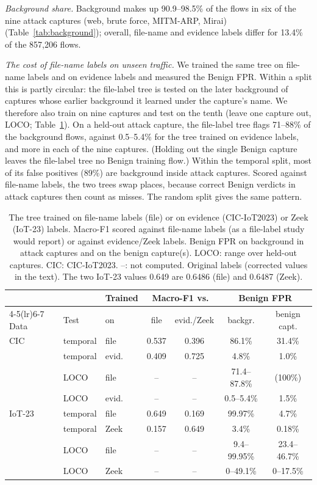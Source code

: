 \emph{Background share.} Background makes up 90.9--98.5\% of the flows in six of the nine attack captures (web, brute force, MITM-ARP, Mirai) (Table~\ref{tab:background}); overall, file-name and evidence labels differ for 13.4\% of the 857,206 flows.

\emph{The cost of file-name labels on unseen traffic.} We trained the same tree on file-name labels and on evidence labels and measured the Benign FPR. Within a split this is partly circular: the file-label tree is tested on the later background of captures whose earlier background it learned under the capture's name. We therefore also train on nine captures and test on the tenth (leave one capture out, LOCO; Table~\ref{tab:filelabel}). On a held-out attack capture, the file-label tree flags 71--88\% of the background flows, against 0.5--5.4\% for the tree trained on evidence labels, and more in each of the nine captures. (Holding out the single Benign capture leaves the file-label tree no Benign training flow.) Within the temporal split, most of its false positives (89\%) are background inside attack captures. Scored against file-name labels, the two trees swap places, because correct Benign verdicts in attack captures then count as misses. The random split gives the same pattern.

\begin{table}[t]
\centering
\caption{The tree trained on file-name labels (file) or on evidence (CIC-IoT2023) or Zeek (IoT-23) labels. Macro-F1 scored against file-name labels (as a file-label study would report) or against evidence/Zeek labels. Benign FPR on background in attack captures and on the benign capture(s). LOCO: range over held-out captures. CIC: CIC-IoT2023. --: not computed. Original labels (corrected values in the text). The two IoT-23 values 0.649 are 0.6486 (file) and 0.6487 (Zeek).}
\label{tab:filelabel}
\footnotesize
\setlength{\tabcolsep}{2.6pt}
\begin{tabular}{lllcccc}
\toprule
 & & Trained & \multicolumn{2}{c}{Macro-F1 vs.} & \multicolumn{2}{c}{Benign FPR} \\
\cmidrule(lr){4-5}\cmidrule(lr){6-7}
Data & Test & on & file & evid./Zeek & backgr. & benign capt. \\
\midrule
CIC & temporal & file  & 0.537 & 0.396 & 86.1\% & 31.4\% \\
            & temporal & evid. & 0.409 & 0.725 & 4.8\% & 1.0\% \\
            & LOCO     & file  & --    & --    & 71.4--87.8\% & (100\%) \\
            & LOCO     & evid. & --    & --    & 0.5--5.4\% & 1.5\% \\
\midrule
IoT-23      & temporal & file  & 0.649 & 0.169 & 99.97\% & 4.7\% \\
            & temporal & Zeek  & 0.157 & 0.649 & 3.4\% & 0.18\% \\
            & LOCO     & file  & --    & --    & 9.4--99.95\% & 23.4--46.7\% \\
            & LOCO     & Zeek  & --    & --    & 0--49.1\% & 0--17.5\% \\
\bottomrule
\end{tabular}
\end{table}


